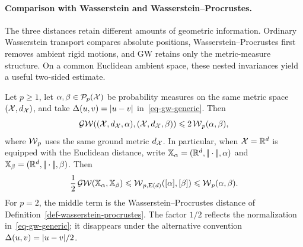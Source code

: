 \paragraph{Comparison with Wasserstein and Wasserstein--Procrustes.}
The three distances retain different amounts of geometric information. Ordinary Wasserstein transport compares absolute positions, Wasserstein--Procrustes first removes ambient rigid motions, and GW retains only the metric-measure structure. On a common Euclidean ambient space, these nested invariances yield a useful two-sided estimate.

\begin{prop}\label{prop-gw-wasserstein-procrustes-comparison}\label{prop-gw-controlled-by-wasserstein}\label{prop-gw-procrustes-upper-certificate}
	Let $p\geq1$, let $\alpha,\beta\in\mathcal{P}_p(\mathcal{X})$ be probability measures on the same metric space $(\mathcal{X},d_{\mathcal{X}})$, and take $\Delta(u,v)=|u-v|$ in~\eqref{eq-gw-generic}. Then
	\begin{equation}\label{eq-gw-fixed-space-wasserstein}
		\operatorname{\mathcal{GW}}((\mathcal{X},d_{\mathcal{X}},\alpha),(\mathcal{X},d_{\mathcal{X}},\beta))
		\leqslant
		2\operatorname{\mathcal{W}}_p(\alpha,\beta),
	\end{equation}
	where $\operatorname{\mathcal{W}}_p$ uses the same ground metric $d_{\mathcal{X}}$. In particular, when $\mathcal{X}=\mathbb{R}^d$ is equipped with the Euclidean distance, write $\mathbb{X}_\alpha=(\mathbb{R}^d,|\!| \cdot |\!|,\alpha)$ and $\mathbb{X}_\beta=(\mathbb{R}^d,|\!| \cdot |\!|,\beta)$. Then
	\begin{equation}\label{eq-gw-wp-wasserstein-comparison}
		\frac12\operatorname{\mathcal{GW}}(\mathbb{X}_\alpha,\mathbb{X}_\beta)
		\leqslant
		\operatorname{\mathcal{W}}_{p,\mathrm E(d)}([\alpha],[\beta])
		\leqslant
		\operatorname{\mathcal{W}}_p(\alpha,\beta).
	\end{equation}
	For $p=2$, the middle term is the Wasserstein--Procrustes distance of Definition~\ref{def-wasserstein-procrustes}. The factor $1/2$ reflects the normalization in~\eqref{eq-gw-generic}; it disappears under the alternative convention $\Delta(u,v)=|u-v|/2$.
\end{prop}
